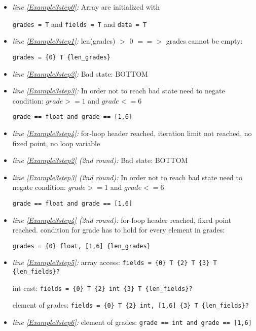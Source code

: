 \documentclass[11pt]{article}
\begin{document}
\begin{itemize}

\item \textit{line \ref{Example3step0}:} Array are initialized with 

\verb|grades = T| and \verb|fields = T| and \verb|data = T|

\item \textit{line \ref{Example3step1}:} len(grades) $>$ 0 $==>$ grades cannot be empty:

\verb|grades = {0} T {len_grades}|

\item \textit{line \ref{Example3step2}:} Bad state: BOTTOM

\item \textit{line \ref{Example3step3}:} In order not to reach bad state need to negate condition: $grade >= 1$ and $grade <= 6$

\verb|grade == float and grade == [1,6]|

\item \textit{line \ref{Example3step4}:} for-loop header reached, iteration limit not reached, no fixed point, no loop variable

\item \textit{line \ref{Example3step2} (2nd round):} Bad state: BOTTOM

\item \textit{line \ref{Example3step3} (2nd round):} In order not to reach bad state need to negate condition: $grade >= 1$ and $grade <= 6$

\verb|grade == float and grade == [1,6]|

\item \textit{line \ref{Example3step4} (2nd round):} for-loop header reached, fixed point reached. condition for grade has to hold for every element in grades:

\verb|grades = {0} float, [1,6] {len_grades}|

\item \textit{line \ref{Example3step5}:} array access: \verb|fields = {0} T {2} T {3} T {len_fields}?|

int cast: \verb|fields = {0} T {2} int {3} T {len_fields}?|

element of grades: \verb|fields = {0} T {2} int, [1,6] {3} T {len_fields}?|

\item \textit{line \ref{Example3step6}:} element of grades: \verb|grade == int and grade == [1,6]|


\end{itemize}
\end{document}
